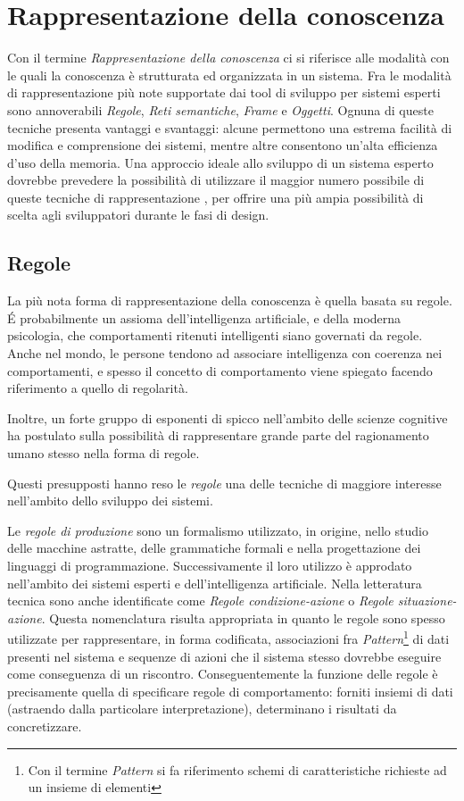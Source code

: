 \section{Rappresentazione della conoscenza}
Con il termine \emph{Rappresentazione della conoscenza} ci si riferisce alle modalità con le quali la conoscenza è strutturata ed organizzata in un sistema. Fra le modalità di rappresentazione più note supportate dai tool di sviluppo per sistemi esperti sono annoverabili \emph{Regole}, \emph{Reti semantiche}, \emph{Frame} e \emph{Oggetti}. Ognuna di queste tecniche presenta vantaggi e svantaggi: alcune permettono una estrema facilità di modifica e comprensione dei sistemi, mentre altre consentono un'alta efficienza d'uso della memoria. Una approccio ideale allo sviluppo di un sistema esperto dovrebbe prevedere la possibilità di utilizzare il maggior numero possibile di queste tecniche di rappresentazione \cite{development1993}, per offrire una più ampia possibilità di scelta agli sviluppatori durante le fasi di design.

\subsection{Regole}
La più nota forma di rappresentazione della conoscenza è quella basata su regole. \'E probabilmente un assioma dell'intelligenza artificiale, e della moderna psicologia, che comportamenti ritenuti intelligenti siano governati da regole. Anche nel mondo, le persone tendono ad associare intelligenza con coerenza nei comportamenti, e spesso il concetto di comportamento viene spiegato facendo riferimento a quello di regolarità. \cite{jackson1999}

Inoltre, un forte gruppo di esponenti di spicco nell'ambito delle scienze cognitive ha postulato sulla possibilità di rappresentare grande parte del ragionamento umano stesso nella forma di regole. \cite{anderson1993rules}

Questi presupposti hanno reso le \emph{regole} una delle tecniche di maggiore interesse nell'ambito dello sviluppo dei sistemi.

Le \emph{regole di produzione} sono un formalismo utilizzato, in origine, nello studio delle macchine astratte, delle grammatiche formali e nella progettazione dei linguaggi di programmazione. Successivamente il loro utilizzo è approdato nell'ambito dei sistemi esperti e dell'intelligenza artificiale. Nella letteratura tecnica sono anche identificate come \emph{Regole condizione-azione} o \emph{Regole situazione-azione}. Questa nomenclatura risulta appropriata in quanto le regole sono spesso utilizzate per rappresentare, in forma codificata, associazioni fra \emph{Pattern}\footnote{Con il termine \emph{Pattern} si fa riferimento schemi di caratteristiche richieste ad un insieme di elementi} di dati presenti nel sistema e sequenze di azioni che il sistema stesso dovrebbe eseguire come conseguenza di un riscontro. Conseguentemente la funzione delle regole è precisamente quella di specificare regole di comportamento: forniti insiemi di dati (astraendo dalla particolare interpretazione), determinano i risultati da concretizzare.

